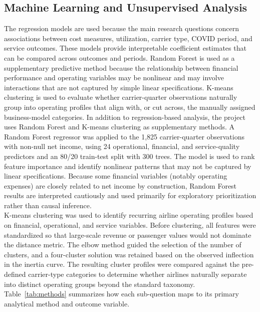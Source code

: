 \documentclass[11pt, letterpaper]{article}
\begin{document}
\subsection{Machine Learning and Unsupervised Analysis}
The regression models are used because the main research questions concern associations between cost measures, utilization, carrier type, COVID period, and service outcomes. These models provide interpretable coefficient estimates that can be compared across outcomes and periods. Random Forest is used as a supplementary predictive method because the relationship between financial performance and operating variables may be nonlinear and may involve interactions that are not captured by simple linear specifications. K-means clustering is used to evaluate whether carrier-quarter observations naturally group into operating profiles that align with, or cut across, the manually assigned business-model categories. In addition to regression-based analysis, the project uses Random Forest and K-means clustering as supplementary methods. A Random Forest regressor was applied to the 1,825 carrier-quarter observations with non-null net income, using 24 operational, financial, and service-quality predictors and an 80/20 train-test split with 300 trees. The model is used to rank feature importance and identify nonlinear patterns that may not be captured by linear specifications. Because some financial variables (notably operating expenses) are closely related to net income by construction, Random Forest results are interpreted cautiously and used primarily for exploratory prioritization rather than causal inference.\\
\indent K-means clustering was used to identify recurring airline operating profiles based on financial, operational, and service variables. Before clustering, all features were standardized so that large-scale revenue or passenger values would not dominate the distance metric. The elbow method guided the selection of the number of clusters, and a four-cluster solution was retained based on the observed inflection in the inertia curve. The resulting cluster profiles were compared against the pre-defined carrier-type categories to determine whether airlines naturally separate into distinct operating groups beyond the standard taxonomy.\\
\indent Table~\ref{tab:methods} summarizes how each sub-question maps to its primary analytical method and outcome variable.
\end{document}
